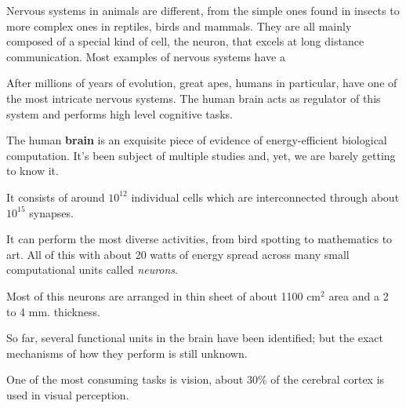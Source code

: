 Nervous systems in animals are different, from the simple ones found in insects to more complex ones in reptiles, birds and mammals. They are all mainly composed of a special kind of cell, the neuron, that excels at long distance communication. Most examples of nervous systems have a 

After millions of years of evolution, great apes, humans in particular,  have one of the most intricate nervous systems. The human brain acts as regulator of this system and performs high level cognitive tasks.

The human \textbf{brain} is an exquisite piece of evidence of energy-efficient biological computation. It's been subject of multiple studies and, yet, we are barely getting to know it. 

It consists of around $10^{12}$ individual cells which are interconnected through about $10^{15}$ synapses.


It can perform the most diverse activities, from bird spotting to mathematics to art. All of this with about 20 watts of energy spread across many small computational units called \emph{neurons}.



Most of this neurons are arranged in thin sheet of about 1100 cm$^2$ area and a 2 to 4 mm. thickness.

So far, several functional units in the brain have been identified; but the exact mechanisms of how they perform is still unknown.


One of the most consuming tasks is vision, about 30\% of the cerebral cortex is used in visual perception. 

